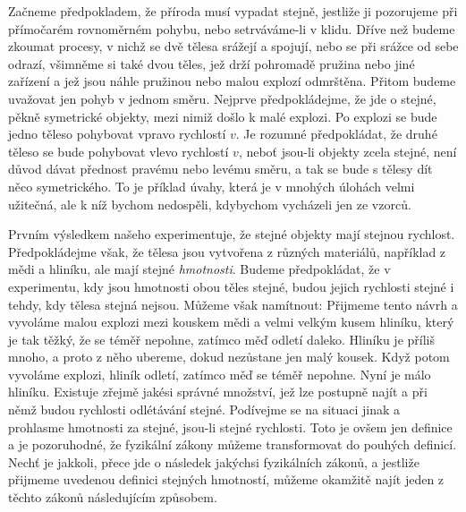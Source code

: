     Začneme předpokladem, že příroda musí vypadat stejně, jestliže ji pozorujeme při přímočarém 
    rovnoměrném pohybu, nebo setrváváme-li v klidu. Dříve než budeme zkoumat procesy, v nichž se 
    dvě tělesa srážejí a spojují, nebo se při srážce od sebe odrazí, všimněme si také dvou těles, 
    jež drží pohromadě pružina nebo jiné zařízení a jež jsou náhle pružinou nebo malou explozí 
    odmrštěna. Přitom budeme uvažovat jen pohyb v jednom směru. Nejprve předpokládejme, že jde o 
    stejné, pěkně symetrické objekty, mezi nimiž došlo k malé explozi. Po explozi se bude jedno 
    těleso pohybovat vpravo rychlostí \(v\). Je rozumné předpokládat, že druhé těleso se bude 
    pohybovat vlevo rychlostí \(v\), neboť jsou-li objekty zcela stejné, není důvod dávat přednost 
    pravému nebo levému směru, a tak se bude s tělesy dít něco symetrického. To je příklad úvahy, 
    která je v mnohých úlohách velmi užitečná, ale k níž bychom nedospěli, kdybychom vycházeli jen 
    ze vzorců.
    
    Prvním výsledkem našeho experimentuje, že stejné objekty mají stejnou rychlost. Předpokládejme 
    však, že tělesa jsou vytvořena z různých materiálů, například z mědi a hliníku, ale mají stejné 
    \emph{hmotnosti}. Budeme předpokládat, že v experimentu, kdy jsou hmotnosti obou těles stejné, 
    budou jejich rychlosti stejné i tehdy, kdy tělesa stejná nejsou. Můžeme však namítnout:  
    Přijmeme tento návrh a vyvoláme malou explozi mezi kouskem mědi a velmi velkým kusem hliníku, 
    který je tak těžký, že se téměř nepohne, zatímco měď odletí daleko. Hliníku je příliš mnoho, a 
    proto z něho ubereme, dokud nezůstane jen malý kousek. Když potom vyvoláme explozi, hliník 
    odletí, zatímco měď se téměř nepohne. Nyní je málo hliníku. Existuje zřejmě jakési správné 
    množství, jež lze postupně najít a při němž budou rychlosti odlétávání stejné. Podívejme se na 
    situaci jinak a prohlasme hmotnosti za stejné, jsou-li stejné rychlosti. Toto je ovšem jen 
    definice a je pozoruhodné, že fyzikální zákony můžeme transformovat do pouhých definicí. Nechť 
    je jakkoli, přece jde o následek jakýchsi fyzikálních zákonů, a jestliže přijmeme uvedenou 
    definici stejných hmotností, můžeme okamžitě najít jeden z těchto zákonů následujícím způsobem.
    
